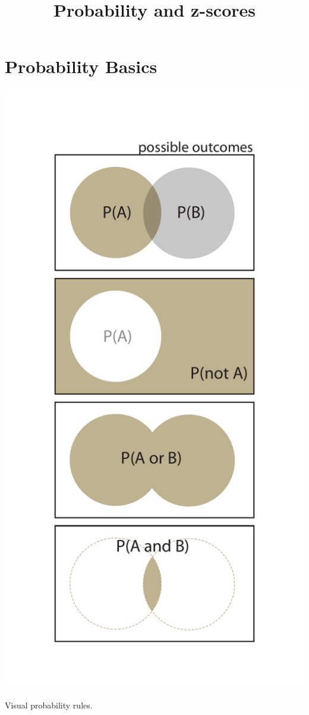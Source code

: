 \documentclass{tufte-handout}
\title{Probability and z-scores}
\date{} %
\begin{document}
\maketitle%



\section{Probability Basics}
\begin{marginfigure}
  \includegraphics[width=\linewidth]{handout2_probability}%
  \label{fig:fullfig}%
  \caption{Visual probability rules.}
\end{marginfigure}
\end{document}
